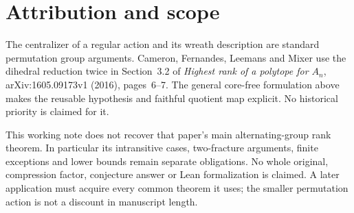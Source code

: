 \documentclass[11pt,a4paper]{article}
\begin{document}
\section*{Attribution and scope}
The centralizer of a regular action and its wreath description are standard
permutation group arguments. Cameron, Fernandes, Leemans and Mixer use
the dihedral reduction twice in Section~3.2 of \emph{Highest rank of a
polytope for $A_n$}, arXiv:1605.09173v1 (2016), pages~6--7. The general
core-free formulation above makes the reusable hypothesis and faithful
quotient map explicit. No historical priority is claimed for it.

This working note does not recover that paper's main alternating-group
rank theorem. In particular its intransitive cases, two-fracture arguments,
finite exceptions and lower bounds remain separate obligations. No whole
original, compression factor, conjecture answer or Lean formalization is
claimed. A later application must acquire every common theorem it uses;
the smaller permutation action is not a discount in manuscript length.
\end{document}

